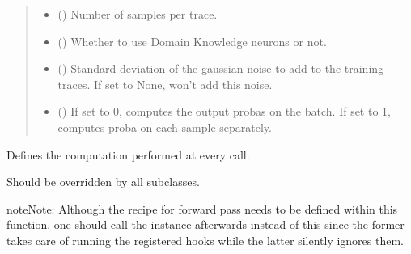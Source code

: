 \documentclass[letterpaper,10pt,english]{sphinxmanual}
\begin{document}
\begin{fulllineitems}
\begin{quote}
\begin{description}
\begin{itemize}
\item {} 
\sphinxAtStartPar
{} () \textendash{} Number of samples per trace.

\item {} 
\sphinxAtStartPar
{} (\sphinxstyleliteralemphasis{\sphinxupquote{, }}) \textendash{} Whether to use Domain Knowledge neurons or not.

\item {} 
\sphinxAtStartPar
{} (\sphinxstyleliteralemphasis{\sphinxupquote{, }}) \textendash{} Standard deviation of the gaussian noise to add to the training traces. If set
to None, won’t add this noise.

\item {} 
\sphinxAtStartPar
{} (\sphinxstyleliteralemphasis{\sphinxupquote{, }}) \textendash{} If set to 0, computes the output probas on the batch. If set to 1, computes proba on
each sample separately.

\end{itemize}

\end{description}\end{quote}

\begin{fulllineitems}
\label{\detokenize{MLSCAlib.Architectures:MLSCAlib.Architectures.torch_models.MCNN.forward}}
\pysigstartsignatures
{}
\pysigstopsignatures
\sphinxAtStartPar
Defines the computation performed at every call.

\sphinxAtStartPar
Should be overridden by all subclasses.

\begin{sphinxadmonition}{note}{Note:}
\sphinxAtStartPar
Although the recipe for forward pass needs to be defined within
this function, one should call the  instance afterwards
instead of this since the former takes care of running the
registered hooks while the latter silently ignores them.
\end{sphinxadmonition}


\end{fulllineitems}
\end{fulllineitems}
\end{document}
